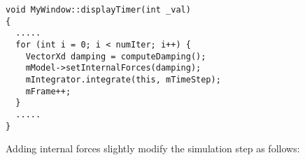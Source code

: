 \ttfamily
\begin{lstlisting}[caption=MyWindow.cpp]
void MyWindow::displayTimer(int _val)
{
  .....
  for (int i = 0; i < numIter; i++) {
    VectorXd damping = computeDamping();
    mModel->setInternalForces(damping);
    mIntegrator.integrate(this, mTimeStep);
    mFrame++;
  }
  .....
}
\end{lstlisting}
\rmfamily

Adding internal forces slightly modify the simulation step as follows:


